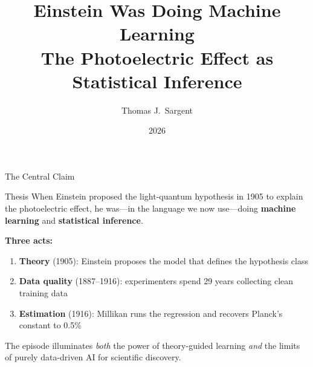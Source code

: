 \documentclass[aspectratio=169,12pt]{beamer}
\title[Einstein Was Doing Machine Learning]{%
  \textbf{Einstein Was Doing Machine Learning}\\[4pt]
  {\normalsize The Photoelectric Effect as Statistical Inference}}
\author{Thomas J.\ Sargent}
\institute{New York University \& Hoover Institution}
\date{2026}
\begin{document}

\begin{frame}[plain]
  \titlepage
\end{frame}

\begin{frame}{The Central Claim}

\begin{block}{Thesis}
When Einstein proposed the light-quantum hypothesis in 1905 to explain
the photoelectric effect, he was---in the language we now use---doing
\textbf{machine learning} and \textbf{statistical inference}.
\end{block}

\bigskip
\textbf{Three acts:}
\begin{enumerate}
  \item[\color{theoryblue}1.] \textbf{Theory} (1905): Einstein proposes the model that
    defines the hypothesis class
  \item[\color{datared}2.] \textbf{Data quality} (1887--1916): experimenters spend
    29 years collecting clean training data
  \item[\color{mlgreen}3.] \textbf{Estimation} (1916): Millikan runs the regression
    and recovers Planck's constant to 0.5\%
\end{enumerate}

\bigskip
\small The episode illuminates \emph{both} the power of theory-guided
learning \emph{and} the limits of purely data-driven AI for scientific
discovery.

\end{frame}
\end{document}
